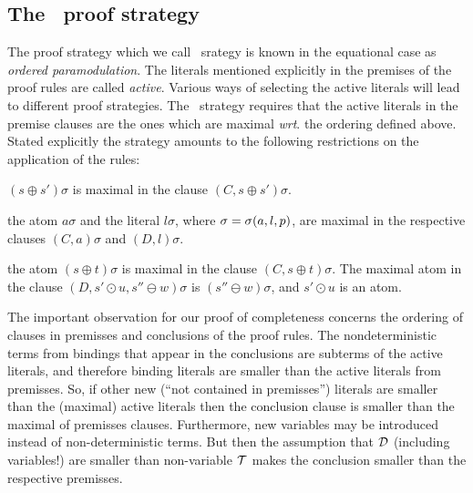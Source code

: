\subsection {The \strategy\ proof strategy} \label {se:strategy}
%
The proof strategy
which we call \strategy\ srategy 
is known in the equational case as {\em ordered
paramodulation}.
%
%
The literals mentioned explicitly in the premises of the proof rules are
called {\em active}. Various ways of selecting the active literals will lead
to different proof strategies. The \strategy\ strategy requires that the
active literals in the premise clauses are the ones which are maximal {\it
wrt}. the ordering defined above.  Stated explicitly the strategy amounts to
the following restrictions on the application of the rules:
\begin{description}\smallerspaces
\item[Reflexivity resolution:] \((s\oplus s')\sigma\) is maximal
in the clause \((C,s\oplus s')\sigma\).
\item [Superposition:] the atom \(a\sigma\) and the literal \(l\sigma\),
where \(\sigma=\sigma(a,l,p)\), are maximal in the respective clauses
\((C,a)\sigma\) and \((D,l)\sigma\).
\item [Compositionality resolution:] the atom \((s\oplus t)\sigma\) is maximal
in the clause \((C,s\oplus t )\sigma\). The maximal atom in the clause
\((D, s'\odot u, s''\ominus w)\sigma\) is \((s''\ominus w)\sigma\), and
\(s'\odot u\) is an atom.
\end{description}
%
The important observation for our proof of completeness concerns the ordering of
clauses in premisses and conclusions of the proof rules.  The
nondeterministic terms from bindings that appear in the conclusions are subterms
of the active literals, and therefore binding literals are smaller than
the active literals from premisses.  So, if other new (``not contained
in premisses'') literals are smaller than the (maximal) active literals
then the conclusion clause is smaller than the maximal of premisses clauses.
Furthermore, new variables may be introduced instead of non-deterministic terms.
But then the assumption that ${\cal D}$ (including variables!) 
are smaller than non-variable ${\cal T}$ makes the conclusion smaller than the 
respective premisses.
%
%
